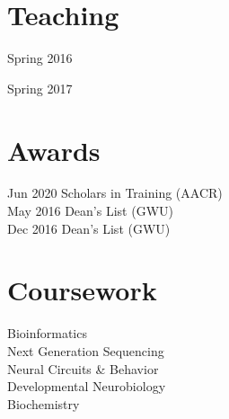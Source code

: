 
\newpage %

\begin{minipage}[t]{0.32\textwidth} %
\sectionspace
\section{Teaching}
\vspace{\topsep} %
\begin{tightitemize}
\item Spring 2016
\item Spring 2017
\end{tightitemize}

\section{Awards} 
Jun 2020 Scholars in Training (AACR)\\
May 2016 Dean's List (GWU) \\
Dec 2016 Dean's List (GWU) \\


\section{Coursework}
Bioinformatics \\
Next Generation Sequencing \\
Neural Circuits \& Behavior \\
Developmental Neurobiology \\
Biochemistry

\end{minipage} %
\hfill
